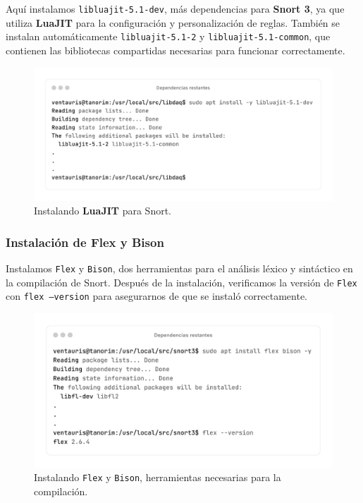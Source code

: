 \documentclass[11pt,a4paper,twoside]{report}
\begin{document}
Aquí instalamos \texttt{libluajit-5.1-dev}, más dependencias para \textbf{Snort 3}, ya que utiliza \textbf{LuaJIT} para la configuración y personalización de reglas. También se instalan automáticamente \texttt{libluajit-5.1-2} y \texttt{libluajit-5.1-common}, que contienen las bibliotecas compartidas necesarias para funcionar correctamente.

\begin{figure}[H]
	\centering
	\includegraphics[scale=0.12]{instalacion_snort/16-16.png}
	\caption{Instalando \textbf{LuaJIT} para Snort.}
\end{figure}

\newpage

\subsubsection*{Instalación de Flex y Bison}

Instalamos \texttt{Flex} y \texttt{Bison}, dos herramientas para el análisis léxico y sintáctico en la compilación de Snort. Después de la instalación, verificamos la versión de \texttt{Flex} con \texttt{flex --version} para asegurarnos de que se instaló correctamente.

\begin{figure}[H]
	\centering
	\includegraphics[scale=0.12]{instalacion_snort/19-19.png}
	\caption{Instalando \texttt{Flex} y \texttt{Bison}, herramientas necesarias para la compilación.}
\end{figure}
\end{document}
